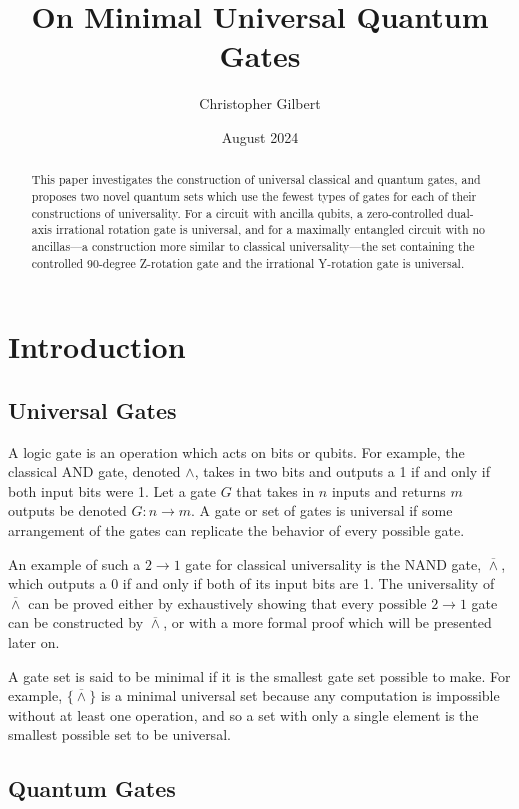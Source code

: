 \documentclass[12pt]{article}
\title{On Minimal Universal Quantum Gates}
\author{Christopher Gilbert}
\date{August 2024}
\newcommand{\nand}{\overline{\land}}
\begin{document}
\maketitle

\begin{abstract}
This paper investigates the construction of universal classical and quantum gates, and proposes two novel quantum sets which use the fewest types of gates for each of their constructions of universality. For a circuit with ancilla qubits, a zero-controlled dual-axis irrational rotation gate is universal, and for a maximally entangled circuit with no ancillas—a construction more similar to classical universality—the set containing the controlled 90-degree Z-rotation gate and the irrational Y-rotation gate is universal.
\end{abstract}

\section{Introduction}

\subsection{Universal Gates}
A logic gate is an operation which acts on bits or qubits. For example, the classical AND gate, denoted $\land$, takes in two bits and outputs a 1 if and only if both input bits were 1. Let a gate $G$ that takes in $n$ inputs and returns $m$ outputs be denoted $G : n \to m$. A gate or set of gates is universal if some arrangement of the gates can replicate the behavior of every possible gate.

An example of such a $2 \to 1$ gate for classical universality is the NAND gate, $\nand$, which outputs a 0 if and only if both of its input bits are 1. The universality of $\nand$ can be proved either by exhaustively showing that every possible $2 \to 1$ gate can be constructed by $\nand$, or with a more formal proof which will be presented later on.

A gate set is said to be minimal if it is the smallest gate set possible to make. For example, $\{ \nand \}$ is a minimal universal set because any computation is impossible without at least one operation, and so a set with only a single element is the smallest possible set to be universal.

\subsection{Quantum Gates}
\end{document}
